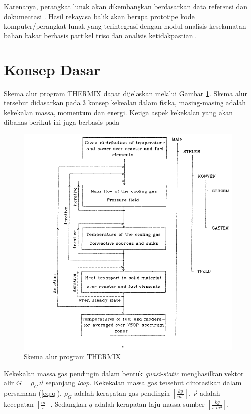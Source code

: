 \documentclass[a4paper,11pt]{report}
\begin{document}
Karenanya, perangkat lunak akan dikembangkan berdasarkan data referensi dan dokumentasi  \textbf{\cite{vsop1,vsop2}}. Hasil rekayasa balik akan berupa prototipe kode komputer/perangkat lunak yang terintegrasi dengan modul analisis keselamatan bahan bakar berbasis partikel triso \cite{triac1} dan analisis ketidakpastian \cite{lhs}.

\section{Konsep Dasar}
Skema alur program THERMIX dapat dijelaskan melalui Gambar \ref{fig:flowscheme}. Skema alur tersebut didasarkan pada 3 konsep kekealan dalam fisika, masing-masing adalah kekekalan massa, momentum dan energi. Ketiga aspek kekekalan yang akan dibahas berikut ini juga berbasis pada \cite{vsop1}

\begin{figure}[h!]
  \begin{center}
    \includegraphics[scale=.5]{pics/flowScheme.png}
    \caption{Skema alur program THERMIX \cite{vsop1}}
    \label{fig:flowscheme}
  \end{center}
\end{figure}

Kekekalan massa gas pendingin dalam bentuk \textit{quasi-static} menghasilkan vektor alir $G=\rho_G \vec{\nu}$ sepanjang \textit{loop}. Kekekalan massa gas tersebut dinotasikan dalam persamaan (\ref{eq:q}). $\rho_G$ adalah kerapatan gas pendingin $\left[ \frac{kg}{m^3}\right]$. $\vec{\nu}$ adalah kecepatan $\left[ \frac{m}{s} \right]$. Sedangkan $q$ adalah kerapatan laju massa sumber $\left[\frac{kg}{s.m^3}\right]$.
\end{document}
